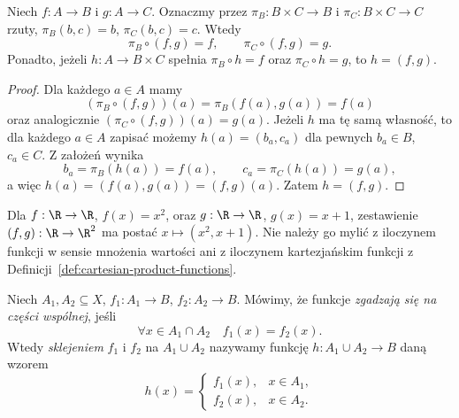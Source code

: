 \begin{twierdzenie}\label{thm:pairing-universal}
Niech $f:A\to B$ i $g:A\to C$. Oznaczmy przez
$\pi_B:B\times C\to B$ i $\pi_C:B\times C\to C$ rzuty,
$\pi_B(b,c)=b$, $\pi_C(b,c)=c$. Wtedy
\[
\pi_B\circ(f,g)=f,
\qquad
\pi_C\circ(f,g)=g.
\]
Ponadto, jeżeli $h:A\to B\times C$ spełnia
$\pi_B\circ h=f$ oraz $\pi_C\circ h=g$, to $h=(f,g)$.
\end{twierdzenie}
\begin{proof}
Dla każdego $a\in A$ mamy
\[
(\pi_B\circ(f,g))(a)=\pi_B(f(a),g(a))=f(a)
\]
oraz analogicznie $(\pi_C\circ(f,g))(a)=g(a)$.
Jeżeli $h$ ma tę samą własność, to dla każdego $a\in A$
zapisać możemy $h(a)=(b_a,c_a)$ dla pewnych $b_a\in B$, $c_a\in C$.
Z założeń wynika
\[
 b_a=\pi_B(h(a))=f(a),
 \qquad
 c_a=\pi_C(h(a))=g(a),
\]
a więc $h(a)=(f(a),g(a))=(f,g)(a)$. Zatem $h=(f,g)$.
\end{proof}

\begin{przyklad}
Dla $f:\R\to\R$, $f(x)=x^2$, oraz $g:\R\to\R$, $g(x)=x+1$, zestawienie
$(f,g):\R\to\R^2$ ma postać
$x\mapsto(x^2,x+1)$. Nie należy go mylić z iloczynem funkcji w sensie
mnożenia wartości ani z iloczynem kartezjańskim funkcji z Definicji~\ref{def:cartesian-product-functions}.
\end{przyklad}

\begin{definicja}\label{def:gluing-functions}
Niech $A_1,A_2\subseteq X$, $f_1:A_1\to B$, $f_2:A_2\to B$.
Mówimy, że funkcje \emph{zgadzają się na części wspólnej}, jeśli
\[
\forall x\in A_1\cap A_2\quad f_1(x)=f_2(x).
\]
Wtedy \emph{sklejeniem} $f_1$ i $f_2$ na $A_1\cup A_2$ nazywamy funkcję
$h:A_1\cup A_2\to B$ daną wzorem
\[
 h(x)=\begin{cases}
 f_1(x),&x\in A_1,\\
 f_2(x),&x\in A_2.
 \end{cases}
\]
\end{definicja}

